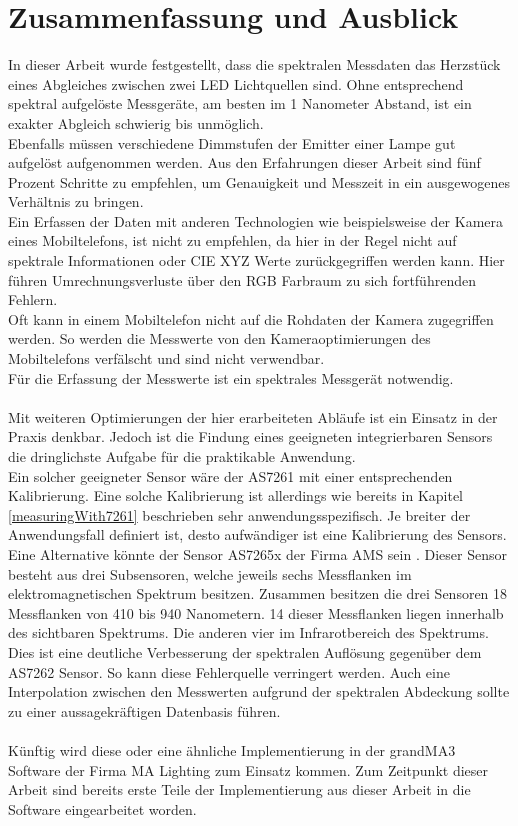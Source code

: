\documentclass[11pt]{scrartcl}
\begin{document}
\section{Zusammenfassung und Ausblick}
In dieser Arbeit wurde festgestellt, dass die spektralen Messdaten das Herzstück eines Abgleiches zwischen
zwei LED Lichtquellen sind. Ohne entsprechend spektral aufgelöste Messgeräte, am besten im 1 Nanometer Abstand,
ist ein exakter Abgleich schwierig bis unmöglich.\\
Ebenfalls müssen verschiedene Dimmstufen der Emitter einer Lampe gut aufgelöst aufgenommen werden. Aus den
Erfahrungen dieser Arbeit sind fünf Prozent Schritte zu empfehlen, um Genauigkeit und Messzeit in ein ausgewogenes
Verhältnis zu bringen.\\
Ein Erfassen der Daten mit anderen Technologien wie beispielsweise der Kamera eines Mobiltelefons, ist nicht zu
empfehlen, da hier in der Regel nicht auf spektrale Informationen oder CIE XYZ Werte zurückgegriffen werden kann.
Hier führen Umrechnungsverluste über den RGB Farbraum zu sich fortführenden Fehlern.\\
Oft kann in einem Mobiltelefon nicht auf die Rohdaten der Kamera zugegriffen werden. So werden die Messwerte von
den Kameraoptimierungen des Mobiltelefons verfälscht und sind nicht verwendbar.\\
Für die Erfassung der Messwerte ist ein spektrales Messgerät notwendig.\\
\\
Mit weiteren Optimierungen der hier erarbeiteten Abläufe ist ein Einsatz in der Praxis denkbar. Jedoch ist die
Findung eines geeigneten integrierbaren Sensors die dringlichste Aufgabe für die praktikable Anwendung.\\
Ein solcher geeigneter Sensor wäre der AS7261 mit einer entsprechenden Kalibrierung. Eine solche Kalibrierung ist
allerdings wie bereits in Kapitel \ref{measuringWith7261} beschrieben sehr anwendungsspezifisch. Je breiter der
Anwendungsfall definiert ist, desto aufwändiger ist eine Kalibrierung des Sensors.\\
Eine Alternative könnte der Sensor AS7265x der Firma AMS sein \cite{datasheet65}. Dieser Sensor besteht aus drei
Subsensoren, welche jeweils sechs Messflanken im elektromagnetischen Spektrum besitzen. Zusammen besitzen die drei
Sensoren 18 Messflanken von 410 bis 940 Nanometern. 14 dieser Messflanken liegen innerhalb des sichtbaren Spektrums.
Die anderen vier im Infrarotbereich des Spektrums.\\
Dies ist eine deutliche Verbesserung der spektralen Auflösung gegenüber dem AS7262 Sensor. So kann diese Fehlerquelle
verringert werden. Auch eine Interpolation zwischen den Messwerten aufgrund der spektralen Abdeckung sollte zu einer
aussagekräftigen Datenbasis führen.\\
\\
Künftig wird diese oder eine ähnliche Implementierung in der grandMA3 Software der Firma MA Lighting zum Einsatz kommen.
Zum Zeitpunkt dieser Arbeit sind bereits erste Teile der Implementierung aus dieser Arbeit in die Software
eingearbeitet worden.
\clearpage
\end{document}
